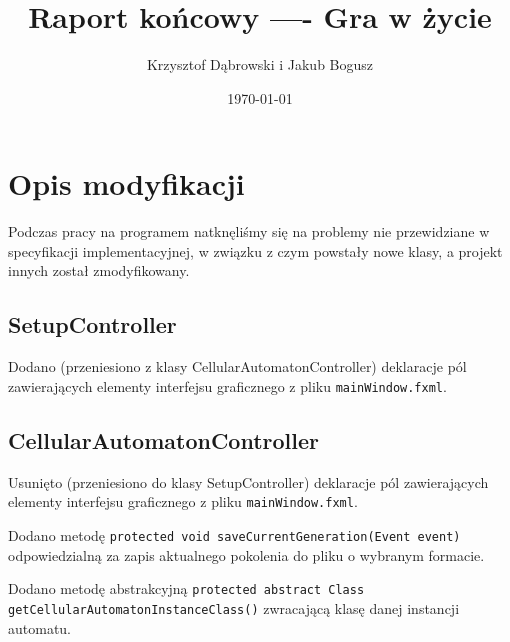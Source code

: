 \documentclass{mwart}
\title{Raport końcowy ---- Gra w życie}
\author{Krzysztof Dąbrowski i Jakub Bogusz}
\date{\today}
\begin{document}
\maketitle{}

\tableofcontents{}


\section{Opis modyfikacji}
Podczas pracy na programem natknęliśmy się na problemy nie przewidziane w specyfikacji implementacyjnej, w związku z czym powstały nowe klasy, a projekt innych został zmodyfikowany.

\subsection{SetupController}
Dodano (przeniesiono z klasy CellularAutomatonController) deklaracje pól zawierających elementy interfejsu graficznego z pliku \texttt{mainWindow.fxml}.

\subsection{CellularAutomatonController}
Usunięto (przeniesiono do klasy SetupController) deklaracje pól zawierających elementy interfejsu graficznego z pliku \texttt{mainWindow.fxml}.

Dodano metodę \texttt{protected void saveCurrentGeneration(Event event)} odpowiedzialną za zapis aktualnego pokolenia do pliku o wybranym formacie.

Dodano metodę abstrakcyjną \texttt{protected abstract Class getCellularAutomatonInstanceClass()} zwracającą klasę danej instancji automatu.\\
\end{document}
